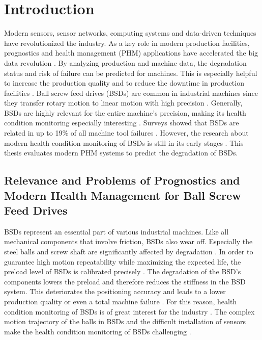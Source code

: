 
\chapter{Introduction}
Modern sensors, sensor networks, computing systems and data-driven techniques have revolutionized the industry. As a key role in modern production facilities, prognostics and health management (PHM) applications have accelerated the big data revolution \cite{ZHAO2019213}. By analyzing production and machine data, the degradation status and risk of failure can be predicted for machines. This is especially helpful to increase the production quality and to reduce the downtime in production facilities \cite{Denkena2021}. Ball screw feed drives (BSDs) are common in industrial machines since they transfer rotary motion to linear motion with high precision \cite{LiPin2018}. Generally, BSDs are highly relevant for the entire machine’s precision, making its health condition monitoring especially interesting \cite{LiPin2018}. Surveys showed that BSDs are related in up to 19\% of all machine tool failures \cite{Denkena2021}. However, the research about modern health condition monitoring of BSDs is still in its early stages \cite{LiPin2018}. This thesis evaluates modern PHM systems to predict the degradation of BSDs.


\section{Relevance and Problems of Prognostics and Modern Health Management for Ball Screw Feed Drives}
BSDs represent an essential part of various industrial machines. Like all mechanical components that involve friction, BSDs also wear off. Especially the steel balls and screw shaft are significantly affected by degradation \cite{Pandhare2021}. In order to guarantee high motion repeatability while maximizing the expected life, the preload level of BSDs is calibrated precisely \cite{Pandhare2021}. The degradation of the BSD's components lowers the preload and therefore reduces the stiffness in the BSD system. This deteriorates the positioning accuracy and leads to a lower production quality or even a total machine failure \cite{Pandhare2021}. For this reason, health condition monitoring of BSDs is of great interest for the industry \cite{Pandhare2021}. The complex motion trajectory of the balls in BSDs and the difficult installation of sensors make the health condition monitoring of BSDs challenging \cite{LiPin2018}.

